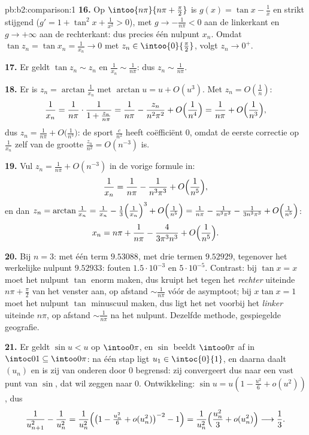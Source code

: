 \begin{solution}{pb:b2:comparison:1}
\textbf{16.} Op $\intoo{n\pi}{n\pi + \frac\pi2}$ is $g(x) = \tan x
- \frac1x$  en strikt stijgend ($g' = 1 + \tan^2x +
\frac1{x^2} > 0$), met $g \to -\frac1{n\pi} < 0$ aan de
linkerkant en $g \to +\infty$ aan de rechterkant: dus precies één
nulpunt $x_n$. Omdat $\tan z_n = \tan x_n = \frac1{x_n} \to 0$ met
$z_n \in \intoo{0}{\frac\pi2}$, volgt $z_n \to 0^+$.

\textbf{17.} Er geldt $\tan z_n \sim z_n$ en $\frac1{x_n} \sim
\frac1{n\pi}$: dus $z_n \sim \frac1{n\pi}$.

\textbf{18.} Er is $z_n = \arctan\frac1{x_n}$ met $\arctan u = u +
O(u^3)$. Met $z_n = O(\frac1n)$:
\[
\frac1{x_n} = \frac{1}{n\pi}\cdot\frac1{1 + \frac{z_n}{n\pi}}
= \frac1{n\pi} - \frac{z_n}{n^2\pi^2} +
O\Bigl(\frac1{n^4}\Bigr)
= \frac1{n\pi} + O\Bigl(\frac1{n^3}\Bigr),
\]
dus $z_n = \frac1{n\pi} + O\bigl(\frac1{n^3}\bigr)$: de sport
$\frac{c}{n^2}$ heeft coëfficiënt $0$, omdat de eerste correctie op
$\frac1{x_n}$ zelf van de grootte $\frac{z_n}{n^2} = O(n^{-3})$
is.

\textbf{19.} Vul $z_n = \frac1{n\pi} + O(n^{-3})$ in de vorige
formule in:
\[
\frac{1}{x_n} = \frac{1}{n\pi} - \frac{1}{n^3\pi^3} +
O\Bigl(\frac1{n^5}\Bigr),
\]
en dan $z_n = \arctan\frac1{x_n} = \frac1{x_n} -
\frac{1}{3}\Bigl(\frac1{x_n}\Bigr)^3 + O\Bigl(\frac1{n^5}\Bigr)
= \frac1{n\pi} - \frac{1}{n^3\pi^3} - \frac{1}{3n^3\pi^3} +
O\Bigl(\frac1{n^5}\Bigr)$:
\[
x_n = n\pi + \frac{1}{n\pi} - \frac{4}{3\pi^3n^3} +
O\Bigl(\frac1{n^5}\Bigr).
\]

\textbf{20.} Bij $n = 3$: met één term $9.53088$, met drie termen
$9.52929$, tegenover het werkelijke nulpunt $9.52933$: fouten
$1.5\cdot10^{-3}$ en $5\cdot10^{-5}$. Contrast: bij $\tan x = x$
moet het nulpunt $\tan$ enorm maken, dus kruipt het tegen het
\emph{rechter} uiteinde $n\pi + \frac\pi2$ van het venster aan, op
afstand $\sim\frac1{n\pi}$ vóór de asymptoot; bij $x\tan x = 1$
moet het nulpunt $\tan$ minuscuul maken, dus ligt het net voorbij
het \emph{linker} uiteinde $n\pi$, op afstand $\sim\frac1{n\pi}$ na
het nulpunt. Dezelfde methode, gespiegelde geografie.

\textbf{21.} Er geldt $\sin u < u$ op $\intoo0\pi$, en $\sin$
beeldt $\intoo0\pi$ af in $\intoc01 \subseteq \intoo0\pi$: na één
stap ligt $u_1 \in \intoc{0}{1}$, en daarna daalt $(u_n)$ en is zij
van onderen door $0$ begrensd: zij convergeert dus naar een vast
punt van $\sin$, dat wil zeggen naar $0$. Ontwikkeling: $\sin u =
u(1 - \frac{u^2}6 + o(u^2))$, dus
\[
\frac{1}{u_{n+1}^2} - \frac1{u_n^2}
= \frac{1}{u_n^2}\Bigl(\bigl(1 - \tfrac{u_n^2}6 +
o(u_n^2)\bigr)^{-2} - 1\Bigr)
= \frac{1}{u_n^2}\Bigl(\frac{u_n^2}{3} + o(u_n^2)\Bigr)
\longrightarrow \frac13 .
\]


\end{solution}
